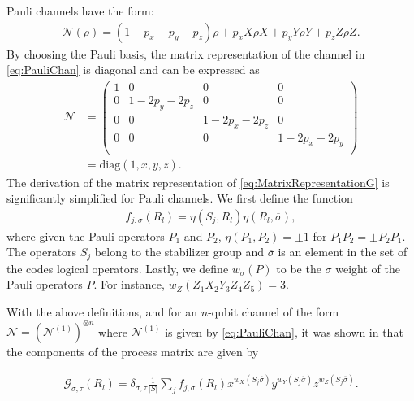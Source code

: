 \documentclass[pra,longbibliography,twocolumn,showpacs,nofootinbib,superscriptaddress,notitlepage]{revtex4-1}
\begin{document}
Pauli channels have the form:
\begin{align}
\mathcal{N}(\rho) = (1-p_{x}-p_{y}-p_{z})\rho + p_{x}X\rho X + p_{y}Y\rho Y + p_{z}Z \rho Z.
\label{eq:PauliChan}
\end{align}
By choosing the Pauli basis, the matrix representation of the channel in \cref{eq:PauliChan} is diagonal and can be expressed as 
\begin{align}
\boldsymbol{\mathcal{N}} &= \left( \begin{array}{cccc}
                                          1 & 0 & 0 & 0  \\
                                          0 & 1-2p_{y}-2p_{z} & 0 & 0\\  
                                          0 & 0 & 1-2p_{x}-2p_{z} & 0\\
                                          0 & 0 & 0 & 1-2p_{x}-2p_{y}\\                                                                   
                                          \end{array} \right) \nonumber \\
&= \mathrm{diag}(1,x,y,z).
\end{align}
The derivation of the matrix representation of \cref{eq:MatrixRepresentationG} is significantly simplified for Pauli channels. We first define the function
\begin{align}
f_{j,\sigma}(R_{l}) = \eta(S_{j},R_{l})\eta(R_{l},\overline{\sigma}),
\label{eq:FunctionCommute}
\end{align}
where given the Pauli operators $P_{1}$ and $P_{2}$, $\eta(P_{1},P_{2}) = \pm1$ for $P_{1}P_{2}=\pm P_{2}P_{1}$. The operators $S_{j}$ belong to the stabilizer group and $\overline{\sigma}$ is an element in the set of the codes logical operators. Lastly, we define $w_{\sigma}(P)$ to be the $\sigma$ weight of the Pauli operators $P$. For instance, $w_{Z}(Z_1X_2Y_3Z_4Z_5) = 3$.

With the above definitions, and for an $n$-qubit channel of the form $\mathcal{N} = (\mathcal{N}^{(1)})^{\otimes n}$ where $\mathcal{N}^{(1)}$ is given by \cref{eq:PauliChan}, it was shown in \cite{RDM02} that the components of the process matrix are given by

\begin{align}
\boldsymbol{\mathcal{G}}_{\sigma,\tau}(R_{l}) = \delta_{\sigma,\tau} \frac{1}{|S|}\sum_{j} f_{j,\sigma}(R_{l})x^{w_{X}(S_{j}\overline{\sigma})}y^{w_{Y}(S_{j}\overline{\sigma})}z^{w_{Z}(S_{j}\overline{\sigma})}.
\label{eq:ProcessMatComponentPauli}
\end{align}
\end{document}
